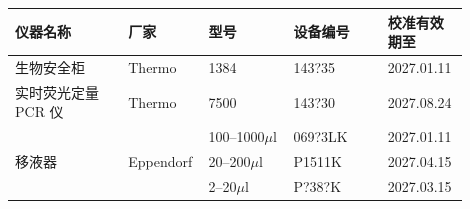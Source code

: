 \documentclass[UTF8,10pt,a4paper,fontset=fandol]{ctexart}
\newcommand{\fieldvalue}[1]{#1}
\newcommand{\handwritten}[1]{#1}
\begin{document}
\begin{center}
\small
\begin{tabular}{|p{0.24\linewidth}|p{0.12\linewidth}|p{0.18\linewidth}|p{0.20\linewidth}|p{0.16\linewidth}|}
\hline
仪器名称 & 厂家 & 型号 & 设备编号 & 校准有效期至 \\
\hline
生物安全柜 &
\fieldvalue{Thermo} &
\fieldvalue{1384} &
\fieldvalue{\handwritten{143?35}} &
\fieldvalue{\handwritten{2027.01.11}} \\
\hline
实时荧光定量 PCR 仪 &
\fieldvalue{Thermo} &
\fieldvalue{7500} &
\fieldvalue{\handwritten{143?30}} &
\fieldvalue{\handwritten{2027.08.24}} \\
\hline
\multirow{3}{*}{移液器} &
\multirow{3}{*}{%
\fieldvalue{Eppendorf}} &
\fieldvalue{\handwritten{100--1000$\mu$l}} &
\fieldvalue{\handwritten{069?3LK}} &
\fieldvalue{\handwritten{2027.01.11}} \\
\cline{3-5}
&
&
\fieldvalue{\handwritten{20--200$\mu$l}} &
\fieldvalue{\handwritten{P1511K}} &
\fieldvalue{\handwritten{2027.04.15}} \\
\cline{3-5}
&
&
\fieldvalue{\handwritten{2--20$\mu$l}} &
\fieldvalue{\handwritten{P?38?K}} &
\fieldvalue{\handwritten{2027.03.15}} \\
\hline
\end{tabular}
\end{center}
\end{document}
